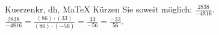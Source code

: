 \begin{MAufgabe}{Kuerzen}{kr, dh, MaTeX}
K\"urzen Sie soweit m\"oglich: $\frac{2838}{-4816}$.\\ 
\ifLsg\MLoesung
\quad $\frac{2838}{-4816}=\frac{(86)\cdot(33)}{(86)\cdot(-56)}=\frac{33}{-56}=\frac{-33}{56}$.\else\relax\fi
 \end{MAufgabe}